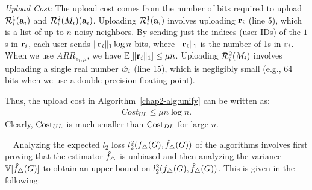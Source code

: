 \textit{Upload Cost:}
The upload cost comes
from the number of bits required to upload $\mathcal{R}_i^1(\mathbf{a}_i)$ and
$\mathcal{R}_i^2(M_i)(\mathbf{a}_i)$.
Uploading $\mathcal{R}_i^1(\mathbf{a}_i)$ involves uploading
$\mathbf{r}_i$ (line 5), which is a list of up to $n$ noisy neighbors. By sending just
the indices (user IDs) of the $1$s in $\mathbf{r}_i$, each user sends $\|\mathbf{r}_i\|_1 \log n$ bits,
where $\|\mathbf{r}_i\|_1$ is the number of 1s in $\mathbf{r}_i$.
When we use $ARR_{\epsilon_1,\mu}$,
we have $\operatorname{\mathbb{E}}[\|\mathbf{r}_i\|_1] \leq \mu n$.
% 
Uploading
$\mathcal{R}_i^2(M_i)$
involves uploading a single real number $\hat{w}_i$ (line 15), which is negligibly small (e.g., 64 bits when we use a double-precision floating-point).

Thus,
the upload cost in Algorithm~\ref{chap2-alg:unify} can be written as:
%
\begin{align}
  Cost_{UL} \leq \mu n \log n.
\label{chap2-eq:CostUL_proposal}
\end{align}
Clearly, 
$\mathrm{Cost}_{UL}{}$ 
is much smaller than 
$\mathrm{Cost}_{DL}{}$ 
for large $n$.

\smallskip
{}~~Analyzing the expected $l_2$ loss $l_2^2(f_\triangle(G), \hat{f}_\triangle(G))$ of the algorithms involves first proving that
the estimator $\hat{f}_\triangle$ is unbiased
and then
analyzing
the
variance $\operatorname{\mathbb{V}}[\hat{f}_\triangle(G)]$ to obtain an upper-bound on
$l_2^2(f_\triangle(G), \hat{f}_\triangle(G))$.
This is given in the following:

